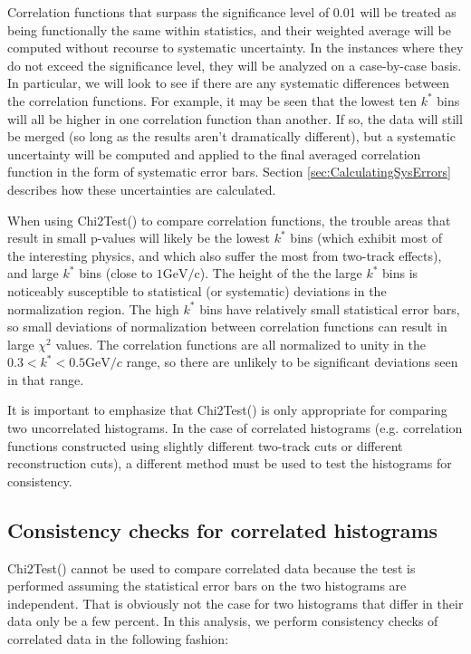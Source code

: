 Correlation functions that surpass the significance level of 0.01 will be treated as being functionally the same within statistics, and their weighted average will be computed without recourse to systematic uncertainty. In the instances where they do not exceed the significance level, they will be analyzed on a case-by-case basis.  In particular, we will look to see if there are any systematic differences between the correlation functions.  For example, it may be seen that the lowest ten $k^*$ bins will all be higher in one correlation function than another.  If so, the data will still be merged (so long as the results aren't dramatically different), but a systematic uncertainty will be computed and applied to the final averaged correlation function in the form of systematic error bars.  Section \ref{sec:CalculatingSysErrors} describes how these uncertainties are calculated.  

When using Chi2Test() to compare correlation functions, the trouble areas that result in small p-values will likely be the lowest $k^*$ bins (which exhibit most of the interesting physics, and which also suffer the most from two-track effects), and large $k^*$ bins (close to $1 \mathrm{GeV/c}$).  The height of the the large $k^*$ bins is noticeably susceptible to statistical (or systematic) deviations in the normalization region.  The high $k^*$ bins have relatively small statistical error bars, so small deviations of normalization between correlation functions can result in large $\chi^2$ values.  The correlation functions are all normalized to unity in the $0.3 < k^* < 0.5 \mathrm{GeV}/c$ range, so there are unlikely to be significant deviations seen in that range.  

It is important to emphasize that Chi2Test() is only appropriate for comparing two uncorrelated histograms.  In the case of correlated histograms (e.g. correlation functions constructed using slightly different two-track cuts or different reconstruction cuts), a different method must be used to test the histograms for consistency.  


\subsection{Consistency checks for correlated histograms}
\label{sec:ConsistencyCheckCorrelated}
Chi2Test() cannot be used to compare correlated data because the test is performed assuming the statistical error bars on the two histograms are independent.  That is obviously not the case for two histograms that differ in their data only be a few percent.  In this analysis, we perform consistency checks of correlated data in the following fashion:

